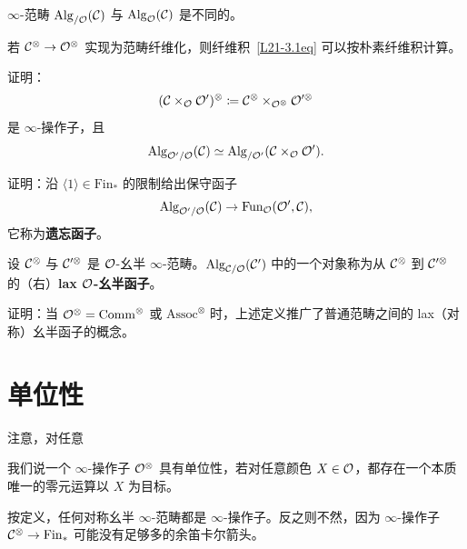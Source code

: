 \begin{warning}\label{L21-3.6}
$\infty$-范畴 $\operatorname{Alg}_{/\mathcal{O}}(\mathcal{C})$ 与 $\operatorname{Alg}_{\mathcal{O}}(\mathcal{C})$ 是不同的。
\end{warning}

\begin{remark}\label{L21-3.7}
若 $\mathcal{C}^{\otimes}\to\mathcal{O}^{\otimes}$ 实现为范畴纤维化，则纤维积~\eqref{L21-3.1eq} 可以按朴素纤维积计算。
\end{remark}

\begin{exercise}\label{L21-3.8}
证明：
\[
(\mathcal{C}\times_{\mathcal{O}}\mathcal{O}')^{\otimes}\coloneqq\mathcal{C}^{\otimes}\times_{\mathcal{O}^{\otimes}}\mathcal{O}^{\prime\otimes}
\]
是 $\infty$-操作子，且
\[
\operatorname{Alg}_{\mathcal{O}'/\mathcal{O}}(\mathcal{C})\simeq\operatorname{Alg}_{/\mathcal{O}'}(\mathcal{C}\times_{\mathcal{O}}\mathcal{O}').
\]
\end{exercise}

\begin{exercise}\label{L21-3.9}
证明：沿 $\langle 1\rangle\in\mathrm{Fin}_{*}$ 的限制给出保守函子
\[
\operatorname{Alg}_{\mathcal{O}'/\mathcal{O}}(\mathcal{C})\to\operatorname{Fun}_{\mathcal{O}}(\mathcal{O}',\mathcal{C}),
\]
它称为\textbf{遗忘函子}。
\end{exercise}

\begin{definition}\label{L21-3.10}
设 $\mathcal{C}^{\otimes}$ 与 $\mathcal{C}^{\prime\otimes}$ 是 $\mathcal{O}$-幺半 $\infty$-范畴。$\operatorname{Alg}_{\mathcal{C}/\mathcal{O}}(\mathcal{C}')$ 中的一个对象称为从 $\mathcal{C}^{\otimes}$ 到 $\mathcal{C}^{\prime\otimes}$ 的（右）\textbf{lax $\mathcal{O}$-幺半函子}。
\end{definition}

\begin{remark}\label{L21-3.11}
证明：当 $\mathcal{O}^{\otimes}=\mathrm{Comm}^{\otimes}$ 或 $\mathrm{Assoc}^{\otimes}$ 时，上述定义推广了普通范畴之间的 lax（对称）幺半函子的概念。
\end{remark}

\section{单位性}

\nitem\label{L21-4.1} 注意，对任意


我们说一个 $\infty$-操作子 $\mathcal{O}^{\otimes}$ 具有单位性，若对任意颜色 $X\in\mathcal{O}$，都存在一个本质唯一的零元运算以 $X$ 为目标。


\nitem\label{L21-A.1} 按定义，任何对称幺半 $\infty$-范畴都是 $\infty$-操作子。反之则不然，因为 $\infty$-操作子 $\mathcal{C}^{\otimes}\to\mathrm{Fin}_{*}$ 可能没有足够多的余笛卡尔箭头。

